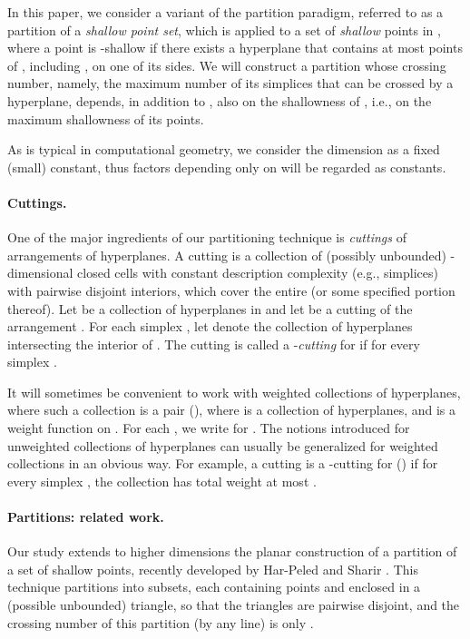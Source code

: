 \documentclass[11pt]{article}
\begin{document}
In this paper, we consider a variant of the partition paradigm, referred to as a partition of a {\em shallow point set}, which is applied to a set  of
{\em shallow} points in , where a point  is -shallow if there exists a hyperplane  that contains at most  points of ,
including , on one of its sides. We will construct a partition whose crossing number, namely, the maximum number of its simplices that can be crossed by
a hyperplane, depends, in addition to , also on the shallowness of , i.e., on the maximum shallowness  of its points.

As is typical in computational geometry, we consider the dimension  as a fixed (small) constant, thus factors depending only on  will be regarded as constants.


\paragraph{Cuttings.}
One of the major ingredients of our partitioning technique is {\em cuttings} of arrangements of hyperplanes. A cutting is a collection of (possibly
unbounded) -dimensional closed cells with constant description complexity (e.g., simplices) with pairwise disjoint interiors, which cover the entire
 (or some specified portion thereof). Let  be a collection of  hyperplanes in  and let  be a cutting of the arrangement
. For each simplex , let  denote the collection of hyperplanes intersecting the interior of . The
cutting  is called a -{\em cutting} for  if  for every simplex .

It will sometimes be convenient to work with weighted collections of hyperplanes, where such a collection is a pair (), where  is a collection of
hyperplanes, and  is a weight function on . For each , we write  for . The notions
introduced for unweighted collections of hyperplanes can usually be generalized for weighted collections in an obvious way. For example, a cutting  is
a -cutting for () if for every simplex , the collection  has total weight at most .


\paragraph{Partitions: related work.} Our study extends to higher dimensions the planar construction of a partition of a set of shallow points, recently
developed by Har-Peled and Sharir \cite{hs11}. This technique partitions  into  subsets, each containing  points and enclosed in a
(possible unbounded) triangle, so that the triangles are pairwise disjoint, and the crossing number of this partition (by any line) is only .
\end{document}
